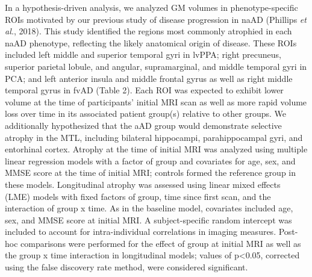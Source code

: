 \documentclass[]{article}
\begin{document}
In a hypothesis-driven analysis, we analyzed GM volumes in
phenotype-specific ROIs motivated by our previous study of disease
progression in naAD (Phillips \emph{et al.}, 2018). This study
identified the regions most commonly atrophied in each naAD phenotype,
reflecting the likely anatomical origin of disease. These ROIs included
left middle and superior temporal gyri in lvPPA; right precuneus,
superior parietal lobule, and angular, supramarginal, and middle
temporal gyri in PCA; and left anterior insula and middle frontal gyrus
as well as right middle temporal gyrus in fvAD (Table 2). Each ROI was
expected to exhibit lower volume at the time of participants' initial
MRI scan as well as more rapid volume loss over time in its associated
patient group(s) relative to other groups. We additionally hypothesized
that the aAD group would demonstrate selective atrophy in the MTL,
including bilateral hippocampi, parahippocampal gyri, and entorhinal
cortex. Atrophy at the time of initial MRI was analyzed using multiple
linear regression models with a factor of group and covariates for age,
sex, and MMSE score at the time of initial MRI; controls formed the
reference group in these models. Longitudinal atrophy was assessed using
linear mixed effects (LME) models with fixed factors of group, time
since first scan, and the interaction of group x time. As in the
baseline model, covariates included age, sex, and MMSE score at initial
MRI. A subject-specific random intercept was included to account for
intra-individual correlations in imaging measures. Post-hoc comparisons
were performed for the effect of group at initial MRI as well as the
group x time interaction in longitudinal models; values of
p\textless{}0.05, corrected using the false discovery rate method, were
considered significant.
\end{document}
